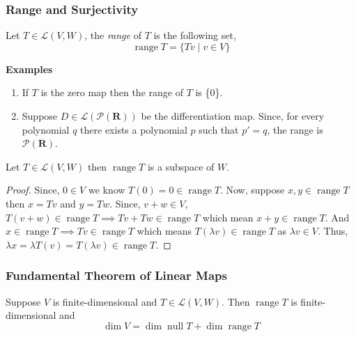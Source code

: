 \subsubsection{Range and Surjectivity}

\begin{definition}
    Let $T \in \mathcal{L}(V,W)$, the \textit{range} of $T$ is the following set,
    \[ \operatorname{range} T = \{Tv \mid v \in V\} \]
\end{definition}

\textbf{Examples}

\begin{enumerate}
    \item If $T$ is the zero map then the range of $T$ is \{0\}.
    \item Suppose $D \in \mathcal{L(\mathcal{P}(\mathbf{R}))}$ be the differentiation map. Since, for every polynomial $q$ there exists
          a polynomial $p$ such that $p'=q$, the range is $\mathcal{P}(\mathbf{R})$.
\end{enumerate}

\begin{proposition}
    Let $T \in \mathcal{L}(V,W)$ then $\operatorname{range} T$ is a subspace of $W$.
\end{proposition}
\begin{proof}
    Since, $0 \in V$ we know $T(0)=0 \in \operatorname{range}T$. Now, suppose $x, y \in \operatorname{range} T$ then
    $x=Tv$ and $y=Tw$. Since, $v+w \in V$, $T(v+w) \in \operatorname{range} T \implies Tv + Tw \in \operatorname{range} T$ which mean
    $x+y \in \operatorname{range} T$. And $x \in \operatorname{range} T \implies Tv \in \operatorname{range}T$ which means 
    $T(\lambda v) \in \operatorname{range} T$ as $\lambda v \in V$. Thus, $\lambda x = \lambda T(v) = T(\lambda v) \in 
    \operatorname{range}T$.  
\end{proof}

\eject 


\subsubsection{Fundamental Theorem of Linear Maps}

\begin{theorem}
    Suppose $V$ is finite-dimensional and $T \in \mathcal{L}(V,W)$. Then $\operatorname{range} T$ is finite-dimensional and
    \[ \dim V = \dim \operatorname{null} T + \dim \operatorname{range} T \]
\end{theorem}

